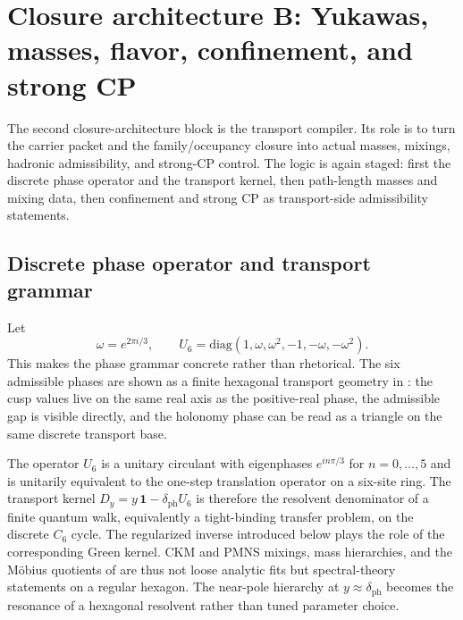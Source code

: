 \section{Closure architecture B: Yukawas, masses, flavor, confinement, and strong CP}

The second closure-architecture block is the transport compiler. Its role is to turn the carrier packet and the family/occupancy closure into actual masses, mixings, hadronic admissibility, and strong-CP control. The logic is again staged: first the discrete phase operator and the transport kernel, then path-length masses and mixing data, then confinement and strong CP as transport-side admissibility statements.

\subsection{Discrete phase operator and transport grammar}

Let
\[
\omega=e^{2\pi i/3},
\qquad
U_6=\mathrm{diag}(1,\omega,\omega^2,-1,-\omega,-\omega^2).
\]
This makes the phase grammar concrete rather than rhetorical. The six admissible phases are shown as a finite hexagonal transport geometry in : the cusp values live on the same real axis as the positive-real phase, the admissible gap is visible directly, and the holonomy phase can be read as a triangle on the same discrete transport base.

\begin{remark}
The operator $U_6$ is a unitary circulant with eigenphases $e^{in\pi/3}$ for $n=0,\dots,5$ and is unitarily equivalent to the one-step translation operator on a six-site ring. The transport kernel $D_y=y\,\mathbf 1-\delta_{\mathrm{ph}}U_6$ is therefore the resolvent denominator of a finite quantum walk, equivalently a tight-binding transfer problem, on the discrete $C_6$ cycle. The regularized inverse introduced below plays the role of the corresponding Green kernel. CKM and PMNS mixings, mass hierarchies, and the Möbius quotients of  are thus not loose analytic fits but spectral-theory statements on a regular hexagon. The near-pole hierarchy at $y\approx\delta_{\mathrm{ph}}$ becomes the resonance of a hexagonal resolvent rather than tuned parameter choice.
\end{remark}

